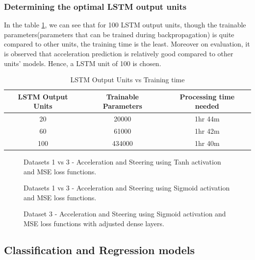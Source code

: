 \subsubsection*{Determining the optimal LSTM output units}
In the table \ref{table:unitsvstime}, we can see that for 100 LSTM output units, though
the trainable parameters(parameters that can be trained during backpropagation) is quite compared to other units, the training time is the least.
Moreover on evaluation, it is observed that acceleration prediction is relatively good
compared to other units' models. Hence, a LSTM unit of 100 is chosen.
\begin{table}[t]
    \centering
\begin{tabular}{|c c c|}
    \hline
    LSTM Output Units & Trainable Parameters & Processing time needed \\\hline
    20 & 20000 & 1hr 44m  \\\hline
    60 & 61000 & 1hr 42m \\\hline
    100 & 434000  & 1hr 40m \\\hline
\end{tabular}
\caption{LSTM Output Units vs Training time}
\label{table:unitsvstime}
\end{table}
\begin{figure}[h]
	\centering
    \def\svgwidth{\textwidth}
    \caption{Datasets 1 vs 3 - Acceleration and Steering using Tanh activation and MSE loss
    functions.}
    \label{fig:ds1and3tanhactivatonMSE}
\end{figure}
\begin{figure}[h]
	\centering
    \def\svgwidth{\textwidth}
    \caption{Datasets 1 vs 3 - Acceleration and Steering using Sigmoid activation and MSE loss
    functions.}
    \label{fig:ds1and3SigactivatonMSE}
\end{figure}
\begin{figure}[h]
	\centering
    \def\svgwidth{\textwidth}
    \caption{Dataset 3 - Acceleration and Steering using Sigmoid activation and MSE loss
    functions with adjusted dense layers.}
    \label{fig:ds3SigactivatonMSE}
\end{figure}

\subsection{Classification and Regression models}
